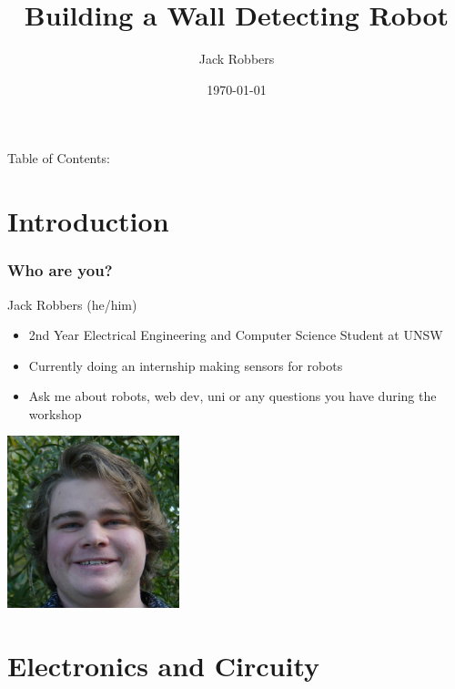 \documentclass[compress]{beamer}
\title{Building a Wall Detecting Robot}
\author{Jack Robbers}
\institute{CREATE UNSW}
\date{\today}
\begin{document}
\begin{frame}
  \maketitle
  Table of Contents:
  \tableofcontents
\end{frame}

\section{Introduction}

\begin{frame}[fragile]
    \frametitle{Who are you?}
    Jack Robbers (he/him) 
    \begin{itemize}
        \item 2nd Year Electrical Engineering and Computer Science Student at UNSW
        \item Currently doing an internship making sensors for robots
        \item Ask me about robots, web dev, uni or any questions you have during the workshop
    \end{itemize}
    
    \includegraphics[height=5cm]{pictures/jack.jpg}
\end{frame}

\section{Electronics and Circuity}
\end{document}
